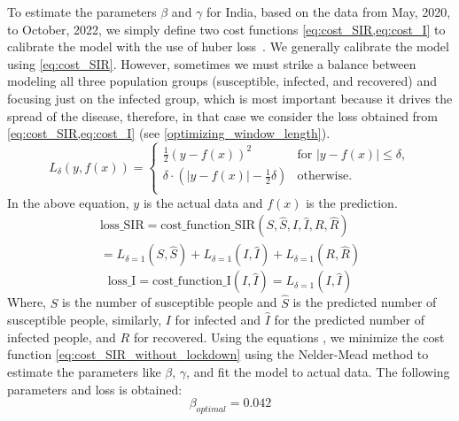 \documentclass[tikz,fleqn,12pt]{wlscirep}
\begin{document}
To estimate the parameters $\beta$ and $\gamma$ for India, based on the data from May, 2020, to October, 2022, we simply define two cost functions \cref{eq:cost_SIR,eq:cost_I} to calibrate the model with the use of huber loss~\cite{huberloss}. We generally calibrate the model using \cref{eq:cost_SIR}. However, sometimes we must strike a balance between modeling all three population groups (susceptible, infected, and recovered) and focusing just on the infected group, which is most important because it drives the spread of the disease, therefore, in that case we consider the loss obtained from \cref{eq:cost_SIR,eq:cost_I} (see \cref{optimizing_window_length}).
\begin{equation}
  L_{\delta}(y, f(x)) = 
  \begin{cases}
    \frac{1}{2}{(y - f(x))^2} & \text{for } |y - f(x)| \leq \delta, \\
    \delta \cdot (|y - f(x)| - \frac{1}{2}\delta) & \text{otherwise.} \\
  \end{cases}
  \label{eq:huberloss}
\end{equation}
In the above equation, $y$ is the actual data and $f(x)$ is the prediction.
\begin{equation}
  \begin{split}
  \textrm{loss\_SIR} = \textrm{cost\_function\_SIR}(S, \hat{S}, I, \hat{I}, R, \hat{R}) \\
  = L_{\delta = 1}(S, \hat{S}) + L_{\delta = 1}(I, \hat{I}) + L_{\delta = 1}(R, \hat{R})
  \end{split}
  \label{eq:cost_SIR}
\end{equation}
\begin{equation}
  \textrm{loss\_I} = \textrm{cost\_function\_I}(I, \hat{I}) = L_{\delta = 1}(I, \hat{I})
  \label{eq:cost_I}
\end{equation}
Where, $S$ is the number of susceptible people and $\hat{S}$ is the predicted number of susceptible people, similarly, $I$ for infected and $\hat{I}$ for the predicted number of infected people, and $R$ for recovered. Using the equations  , we minimize the cost function \cref{eq:cost_SIR_without_lockdown} using the Nelder-Mead method\cite{Gao2010} to estimate the parameters like $\beta$, $\gamma$, and fit the model to actual data. The following parameters and loss is obtained:
\begin{equation}
  \beta_{optimal} = 0.042
  \label{eq:beta_optimal_without_lockdown}
\end{equation}
\end{document}
